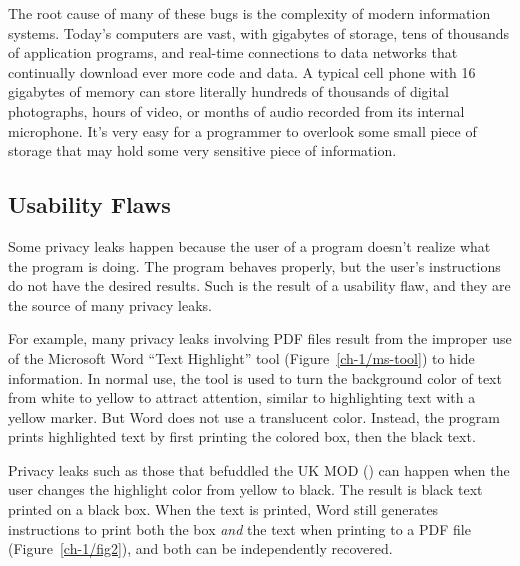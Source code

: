 The root cause of many of these bugs is the complexity
of modern information systems. Today's computers are vast, with
gigabytes of storage, tens of thousands of application programs, and
real-time connections to data networks that continually download ever 
more code and data. A typical cell phone with 16 gigabytes of memory can
store literally hundreds of thousands of digital photographs, hours of
video, or months of audio recorded from its internal
microphone. It's very easy for a programmer to overlook some small
piece of storage that may hold some very sensitive piece of
information. 

\subsection{Usability Flaws}

Some privacy leaks happen because the user of a program doesn't
realize what the program is doing. The program behaves properly,
but the user's instructions do not have the desired results. Such is
the result of a usability flaw, and they are the source of many
privacy leaks. 

For example, many privacy leaks involving PDF files 
result from the improper use of the Microsoft Word ``Text Highlight''
tool (Figure~\ref{ch-1/ms-tool}) to hide information.  In normal use, the tool is used to turn
the background color of text from white to yellow to attract
attention, similar to highlighting text with a yellow marker. But Word
does not use a translucent color. Instead, the program prints
highlighted text by first printing the colored box, then the black
text.


Privacy leaks such as those that befuddled the UK MOD
(\pageref{uk-mod}) can happen when the user changes the highlight color
from yellow to black. The result is black text printed on a black box.
When the text is printed, Word still generates instructions to print
both the box \emph{and} the text when printing to a PDF file
(Figure~\ref{ch-1/fig2}), and both can be independently recovered.


